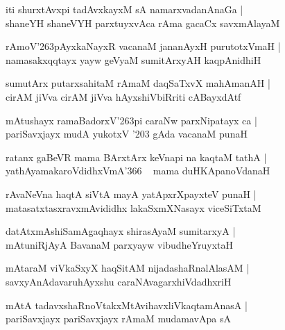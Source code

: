 \documentclass[twoside,12pt,openright]{book}
\def\S{\char'263}
\newcounter{shloka}[chapter]
\begin{document}
\begin{shloka}%
iti shurxtAvxpi tadAvxkayxM sA namarxvadanAnaGa |\\
shaneYH shaneVYH parxtuyxvAca rAma gacaCx savxmAlayaM 
\end{shloka}

\begin{shloka}%
rAmoV\S pAyxkaNayxR vacanaM jananAyxH purutotxVmaH |\\
namasakxqqtayx yayw geVyaM sumitArxyAH kaqpAnidhiH
\end{shloka}

\begin{shloka}%
sumutArx putarxsahitaM rAmaM daqSaTxvX mahAmanAH |\\
cirAM jiVva cirAM jiVva hAyxshiVbiRriti cABayxdAtf
\end{shloka}

\begin{shloka}%
mAtushayx ramaBadorxV\S pi caraNw parxNipatayx ca |\\
pariSavxjayx mudA yukotxV \char'203 gAda vacanaM punaH 
\end{shloka}

\begin{shloka}%
ratanx gaBeVR mama BArxtArx keVnapi na kaqtaM tathA |\\
yathAyamakaroVdidhxVmA\char'366 ~ mama duHKApanoVdanaH 
\end{shloka}

\begin{shloka}%
rAvaNeVna haqtA siVtA mayA yatApxrXpayxteV punaH |\\
matasatxtasxravxmAvididhx lakaSxmXNasayx viceSiTxtaM 
\end{shloka}

\begin{shloka}%
datAtxmAshiSamAgaqhayx shirasAyaM sumitarxyA |\\
mAtuniRjAyA BavanaM parxyayw vibudheYruyxtaH 
\end{shloka}

\begin{shloka}%
mAtaraM viVkaSxyX haqSitAM nijadashaRnalAlasAM |\\
savxyAnAdavaruhAyxshu caraNAvagarxhiVdadhxriH
\end{shloka}

\begin{shloka}%
mAtA tadavxshaRnoVtakxMtAvihavxliVkaqtamAnasA |\\
pariSavxjayx pariSavxjayx rAmaM mudamavApa sA 
\end{shloka}
\end{document}
